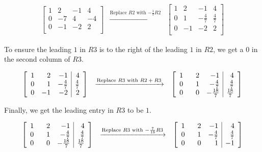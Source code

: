 \documentclass{ximera}
\begin{document}
\begin{example}
\[\begin{array}{ccc}
\left[ \begin{array}{rrr|r}  
1 & 2 & -1 & 4 \\  
0 & -7 & 4 & -4 \\ 
0 & -1 & -2  & 2 \\ 
\end{array} \right]  
& 
\xrightarrow{\text{Replace $R2$ with $-\frac{1}{7}R2$}}  
& 
\left[ \begin{array}{rrr|r} 
1 & 2 & -1 & 4 \\ 
0 & 1 & -\frac{4}{7} & \frac{4}{7} \\ 
0 & -1 & -2 & 2 \\
\end{array} \right]

\end{array}\]

To ensure the leading $1$ in $R3$ is to the right of the leading $1$ in $R2$, we get a $0$ in the second column of $R3$.

\[ \begin{array}{ccc}

\left[ \begin{array}{rrr|r} 
1 & 2 & -1 & 4 \\ 
0 & 1 & -\frac{4}{7} & \frac{4}{7} \\ 
0 & -1 & -2 & 2 \\ 
\end{array} \right]  
& 
\xrightarrow{\text{Replace $R3$ with $R2+R3$}} 
&  
\left[ \begin{array}{rrr|r} 
1 & \hphantom{-}2 & -1 & 4 \\  
0 & 1 & -\frac{4}{7} & \frac{4}{7} \\  
0 & 0 & -\frac{18}{7} & \frac{18}{7} \\ 
\end{array} \right]


\end{array}\]

Finally, we get the leading entry in $R3$ to be $1$.

\[\begin{array}{ccc}

\left[ \begin{array}{rrr|r} 
1 & \hphantom{-}2 & -1 & 4 \\  
0 & 1 & -\frac{4}{7} & \frac{4}{7} \\  
0 & 0 & -\frac{18}{7} & \frac{18}{7} \\ 
\end{array} \right]   
& 
\xrightarrow{\text{Replace $R3$ with $-\frac{7}{18}R3$}} 
& 
\left[ \begin{array}{rrr|r} 
1 & \hphantom{-}2 & -1 & 4 \\ 
0 & 1 & -\frac{4}{7} & \frac{4}{7} \\ 
0 & 0 &1 & -1 \\ 
\end{array} \right]


\end{array}\]
\end{example}
\end{document}
